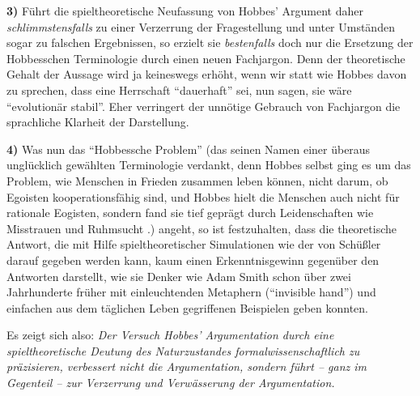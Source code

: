 \documentclass[12pt,a4paper,ngerman]{article}
\begin{document}
{\bf 3)} Führt die spieltheoretische Neufassung von Hobbes' Argument daher
{\em schlimmstensfalls} zu einer Verzerrung der Fragestellung und unter
Umständen sogar zu falschen Ergebnissen, so erzielt sie {\em bestenfalls} 
doch nur die Ersetzung der Hobbesschen Terminologie durch einen neuen
Fachjargon. Denn der theoretische Gehalt der Aussage wird ja
keineswegs erhöht, wenn wir statt wie Hobbes davon zu sprechen, dass eine
Herrschaft "`dauerhaft"' sei, nun sagen, sie wäre "`evolutionär stabil"'. Eher
verringert der unnötige Gebrauch von Fachjargon die sprachliche Klarheit der
Darstellung.

{\bf 4)} Was nun das "`Hobbessche Problem"' (das seinen Namen einer
überaus unglücklich gewählten Terminologie verdankt, denn Hobbes
selbst ging es um das Problem, wie Menschen in Frieden zusammen leben
können, nicht darum, ob Egoisten kooperationsfähig sind, und Hobbes
hielt die Menschen auch nicht für rationale Eogisten, sondern fand sie
tief geprägt durch Leidenschaften wie Misstrauen und Ruhmsucht
\cite[13. Kapitel]{hobbes:1651}.) angeht, so ist festzuhalten, dass
die theoretische Antwort, die mit Hilfe spieltheoretischer
Simulationen wie der von Schüßler darauf gegeben werden kann, kaum
einen Erkenntnisgewinn gegenüber den Antworten darstellt, wie sie
Denker wie Adam Smith schon über zwei Jahrhunderte früher mit
einleuchtenden Metaphern (``invisible hand'') und einfachen aus dem
täglichen Leben gegriffenen Beispielen geben konnten.

Es zeigt sich also: {\em Der Versuch Hobbes' Argumentation durch eine
spieltheoretische Deutung des Naturzustandes formalwissenschaftlich zu
präzisieren, verbessert nicht die Argumentation, sondern führt -- ganz im
Gegenteil -- zur Verzerrung und Verwässerung der Argumentation.}
\end{document}
